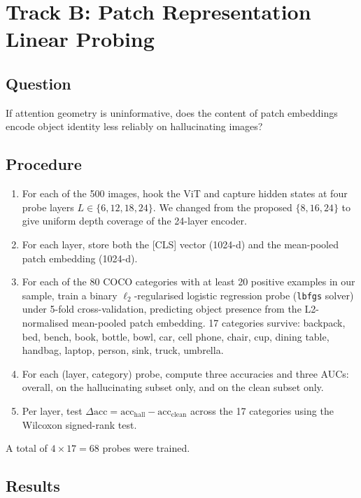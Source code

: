 \documentclass[11pt]{article}
\begin{document}
\section{Track B: Patch Representation Linear Probing}

\subsection{Question}

If attention geometry is uninformative, does the content of patch embeddings encode
object identity less reliably on hallucinating images?

\subsection{Procedure}

\begin{enumerate}
  \item For each of the 500 images, hook the ViT and capture hidden states at four
        probe layers $L \in \{6, 12, 18, 24\}$. We changed from the proposed
        $\{8, 16, 24\}$ to give uniform depth coverage of the 24-layer encoder.
  \item For each layer, store both the [CLS] vector (1024-d) and the mean-pooled patch
        embedding (1024-d).
  \item For each of the 80 COCO categories with at least 20 positive examples in our
        sample, train a binary $\ell_2$-regularised logistic regression probe
        (\texttt{lbfgs} solver) under 5-fold cross-validation, predicting object
        presence from the L2-normalised mean-pooled patch embedding. 17 categories
        survive: backpack, bed, bench, book, bottle, bowl, car, cell phone, chair, cup,
        dining table, handbag, laptop, person, sink, truck, umbrella.
  \item For each (layer, category) probe, compute three accuracies and three AUCs:
        overall, on the hallucinating subset only, and on the clean subset only.
  \item Per layer, test $\Delta\mathrm{acc} = \mathrm{acc}_{\mathrm{hall}} -
        \mathrm{acc}_{\mathrm{clean}}$ across the 17 categories using the Wilcoxon
        signed-rank test.
\end{enumerate}

A total of $4 \times 17 = 68$ probes were trained.

\subsection{Results}
\end{document}
